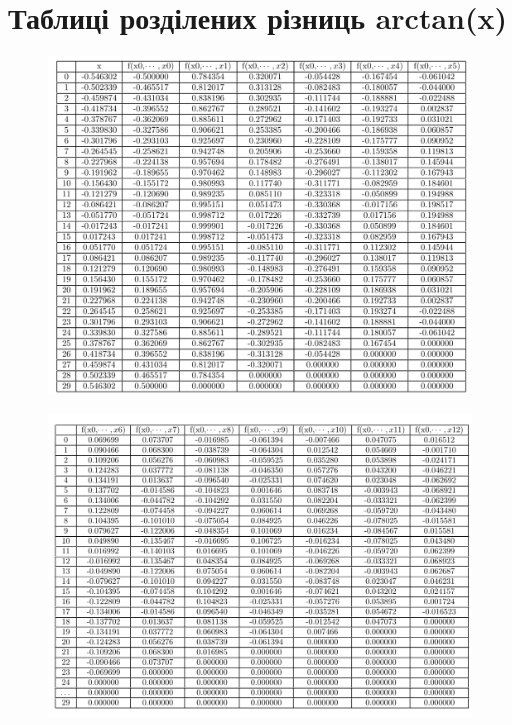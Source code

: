 \documentclass[a4paper, 12pt]{article}
\begin{document}
\section{Таблиці розділених різниць arctan(x)} \label{sec:table2}
\begin{figure}[ht]
	\centering
	\includegraphics[width=1\linewidth]{./img/t21.png}
\end{figure}

\begin{figure}[ht]
	\centering
	\includegraphics[width=1\linewidth]{./img/t22.png}
\end{figure}
\end{document}
